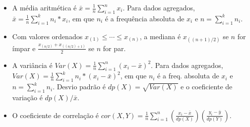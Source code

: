 \documentclass{article}
\begin{document}
\begin{small}
\begin{itemize}
	\item A média aritmética é $\bar{x} = \frac{1}{n} \sum_{i=1}^{n} x_i$. Para dados agregados, $\bar{x} = \frac{1}{n} \sum_{i=1}^{k} n_i * x_i$, em que $n_i$ é a frequência absoluta de $x_i$ e $n=\sum_{i=1}^k n_i$.
	\item Com valores ordenados $x_{(1)} \leq \cdots \leq x_{(n)}$, a mediana é $x_{((n+1)/2)}$ se $n$ for ímpar e $\frac{x_{(n/2)} + x_{((n/2) + 1)}}{2}$ se $n$ for par.
	\item A variância é $Var(X) = \frac{1}{n} \sum_{i=1}^n (x_i - \bar{x})^2$. Para dados agregados, $Var(X) = \frac{1}{n} \sum_{i=1}^k n_i * (x_i - \bar{x})^2$, em que $n_i$ é a freq. absoluta de $x_i$ e $n=\sum_{i=1}^k n_i$. Desvio padrão é $dp(X) = \sqrt{Var(X)}$ e o coeficiente de variação é $dp(X)/\bar{x}$.
	\item O coeficiente de correlação é $cor(X,Y) = \frac{1}{n} \sum_{i=1}^n \left( \frac{x_i - \bar{x}}{dp(X)} \right) \left( \frac{y_i - \bar{y}}{dp(Y)} \right)$.
	

\end{itemize}
\end{small}
\end{document}
